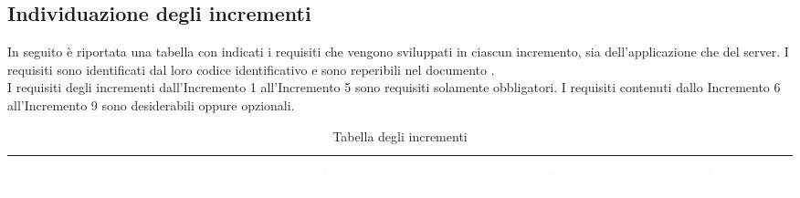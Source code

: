 \subsection{Individuazione degli incrementi}
In seguito è riportata una tabella con indicati i requisiti che vengono sviluppati in ciascun incremento, sia dell'applicazione che del server.
I requisiti sono identificati dal loro codice identificativo e sono reperibili nel documento \AdR{}.\\
I requisiti degli incrementi dall'Incremento 1 all'Incremento 5 sono requisiti solamente obbligatori. I requisiti contenuti dallo Incremento 6 all'Incremento 9 sono desiderabili oppure opzionali. 

{
\renewcommand{\arraystretch}{2}
\centering
	
\begin{longtable}{C{2.5cm} C{3.2cm} C{2.8cm} C{2.8cm} C{2.8cm}}
\caption{Tabella degli incrementi}\\
\textcolor{white}{\textbf{Incremento}} &
\textcolor{white}{\textbf{Obiettivo dell'incremento}} & 
\textcolor{white}{\textbf{Requisiti per l'app utenti}} &
\textcolor{white}{\textbf{Requisiti per il web-app admin}} &
\textcolor{white}{\textbf{Requisiti per il server}} \\
\endhead





















\end{longtable}
}